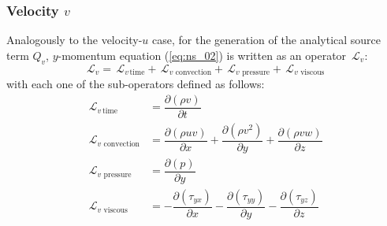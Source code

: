 \documentclass[10pt]{article}
\newcommand{\Diff}[2] {\dfrac{\partial( #1)}{\partial #2}}
\newcommand{\Lo}{\,\mathcal{L}}
\newcommand{\convection}{\,\text{convection}}
\newcommand{\viscous}{\,\text{viscous}}
\newcommand{\pressure}{\,\text{pressure}}
\begin{document}
\subsubsection{Velocity $v$}
Analogously to the velocity-$u$ case, for the generation of the analytical source term $Q_v$, $y$-momentum equation (\ref{eq:ns_02}) is written as an operator $\Lo_v$:
 $$\Lo_v = \Lo_{v \, \text{time}}+\Lo_{v \, \convection}+\Lo_{v \, \pressure }+\Lo_{v \, \viscous }$$
with each one of the sub-operators defined as follows:
\begin{equation*}
 \begin{split}
\Lo_{v \, \text{time}}&= \Diff{\rho v}{t} \\
\Lo_{v \, \convection}&= \Diff{\rho uv }{x}+\Diff{\rho v^2}{y} +\Diff{\rho vw}{z}\\
\Lo_{v \, \pressure }&= \Diff{p}{y}\\
\Lo_{v \, \viscous }&= -\Diff{\tau_{yx}}{x}-\Diff{\tau_{yy}}{y}-\Diff{\tau_{yz}}{z}
 \end{split}
\end{equation*}
\end{document}
